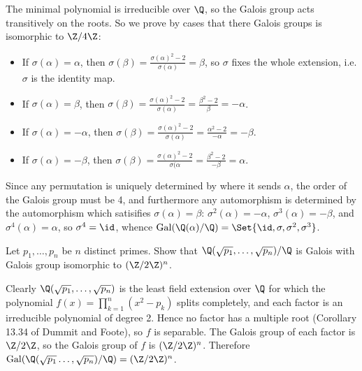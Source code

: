 \documentclass[a4paper, 11pt]{homework}
\newcommand{\Gal}{\mathrm{Gal}}
\begin{document}
\begin{questions}
\begin{solution}
		The minimal polynomial is irreducible over \(\Q\), so the Galois group acts transitively on the roots. So
		we prove by cases that there Galois groups is isomorphic to \(\Z/4\Z\):
		\begin{itemize}
			\item If \(\sigma(\alpha) = \alpha\), then \(\sigma(\beta) = \frac{\sigma(\alpha)^2-2}{\sigma(\alpha)}
			      = \beta\), so \(\sigma\) fixes the whole extension, i.e. \(\sigma\) is the identity map.
			\item If \(\sigma(\alpha) = \beta\), then \(
			      \sigma(\beta) = \frac{\sigma(\alpha)^2-2}{\sigma(\alpha)}
			      = \frac{\beta^2-2}{\beta} = -\alpha\).
			\item If \(\sigma(\alpha) = -\alpha\), then \(
			      \sigma(\beta) = \frac{\sigma(\alpha)^2-2}{\sigma(\alpha)}
			      = \frac{\alpha^2-2}{-\alpha} = -\beta\).
			\item If \(\sigma(\alpha) = -\beta\), then \(
			      \sigma(\beta) = \frac{\sigma(\alpha)^2-2}{\sigma(\alpha}
			      = \frac{\beta^2 - 2}{-\beta} = \alpha\).
		\end{itemize}
		Since any permutation is uniquely determined by where it sends \(\alpha\), the order of the Galois group
		must be 4, and furthermore any automorphism is determined by the automorphism which satisifies \(\sigma(
		\alpha) = \beta\): \(\sigma^2(\alpha) = -\alpha\), \(\sigma^3(\alpha) = -\beta\), and \(\sigma^4(\alpha) =
		\alpha\), so \(\sigma^4 = \id\), whence \(\Gal(\Q(\alpha)/\Q) = \Set{\id, \sigma, \sigma^2, \sigma^3}\).
	\end{solution}

	\question{} Let \(p_1,\dots,p_n\) be \(n\) distinct primes. Show that \(\Q(\sqrt{p_1},\dots,\sqrt{p_n})/\Q\) is
	Galois with Galois group isomorphic to \((\Z/2\Z)^n\).
	\begin{solution}
		Clearly \(\Q(\sqrt{p_1},\dots,\sqrt{p_n})\) is the least field extension over \(\Q\) for which the polynomial
		\(f(x) = \prod_{k=1}^n (x^2-p_k)\) splits completely, and each factor is an irreducible polynomial of degree
		2. Hence no factor has a multiple root (Corollary 13.34 of Dummit and Foote), so \(f\) is separable. The
		Galois group of each factor is \(\Z/2\Z\), so the Galois group of \(f\) is \((\Z/2\Z)^n\). Therefore
		\(\Gal(\Q(\sqrt{p_1}\dots,\sqrt{p_n})/\Q) = (\Z/2\Z)^n\).
	\end{solution}


\end{questions}
\end{document}
